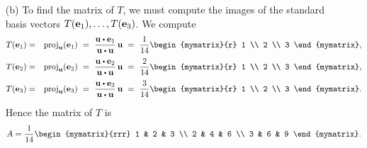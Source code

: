 \begin{solution}
\begin{enumerate}
  \item[(b)] To find the matrix of $T$, we must compute the images of
    the standard basis vectors $T(\vect{e}_1),\ldots,T(\vect{e}_3)$. We compute
    \begin{eqnarray*}
      T(\vect{e}_1)
      &=& \proj_{\vect{u}}(\vect{e}_1)
      ~=~ \frac{\vect{u}\dotprod\vect{e}_1}{\vect{u}\dotprod \vect{u}}\,\vect{u}
      ~=~ \frac{1}{14}\begin{mymatrix}{r} 1 \\ 2 \\ 3 \end{mymatrix},\\
      T(\vect{e}_2)
      &=& \proj_{\vect{u}}(\vect{e}_2)
      ~=~ \frac{\vect{u}\dotprod\vect{e}_2}{\vect{u}\dotprod \vect{u}}\,\vect{u}
      ~=~ \frac{2}{14}\begin{mymatrix}{r} 1 \\ 2 \\ 3 \end{mymatrix},\\
      T(\vect{e}_3)
      &=& \proj_{\vect{u}}(\vect{e}_3)
      ~=~ \frac{\vect{u}\dotprod\vect{e}_3}{\vect{u}\dotprod \vect{u}}\,\vect{u}
      ~=~ \frac{3}{14}\begin{mymatrix}{r} 1 \\ 2 \\ 3 \end{mymatrix}.
    \end{eqnarray*}
    Hence the matrix of $T$ is
    \begin{equation*}
      A = \frac{1}{14}\begin{mymatrix}{rrr}
        1 & 2 & 3 \\
        2 & 4 & 6 \\
        3 & 6 & 9
      \end{mymatrix}.
    \end{equation*}
  \end{enumerate}
\end{solution}

